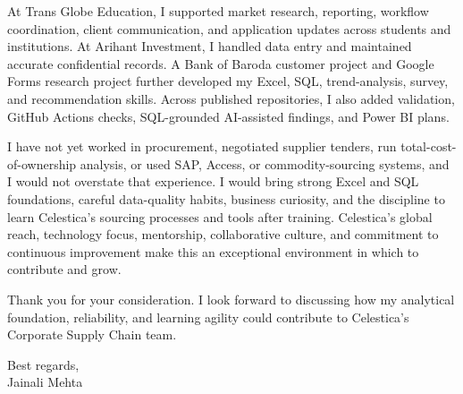 \documentclass[letterpaper,11pt]{article}
\begin{document}
\bigbreak
At Trans Globe Education, I supported market research, reporting, workflow coordination, client communication, and application updates across students and institutions. At Arihant Investment, I handled data entry and maintained accurate confidential records. A Bank of Baroda customer project and Google Forms research project further developed my Excel, SQL, trend-analysis, survey, and recommendation skills. Across published repositories, I also added validation, GitHub Actions checks, SQL-grounded AI-assisted findings, and Power BI plans.

\bigbreak
I have not yet worked in procurement, negotiated supplier tenders, run total-cost-of-ownership analysis, or used SAP, Access, or commodity-sourcing systems, and I would not overstate that experience. I would bring strong Excel and SQL foundations, careful data-quality habits, business curiosity, and the discipline to learn Celestica's sourcing processes and tools after training. Celestica's global reach, technology focus, mentorship, collaborative culture, and commitment to continuous improvement make this an exceptional environment in which to contribute and grow.

\bigbreak
Thank you for your consideration. I look forward to discussing how my analytical foundation, reliability, and learning agility could contribute to Celestica's Corporate Supply Chain team.

\bigbreak
Best regards,\\
Jainali Mehta
\end{document}

